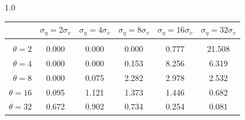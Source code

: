 \documentclass[12pt]{article}
\begin{document}
\begin{table}[h!]
\begin{subtable}{1.0\textwidth}
    \centering
\begin{tabular}{rccccc}
\hline  
            & \multicolumn{1}{l}{$\sigma_{\eta} =2\sigma_{v}$} & \multicolumn{1}{l}{$\sigma_{\eta} =4\sigma_{v}$} & \multicolumn{1}{l}{$\sigma_{\eta} =8\sigma_{v}$} & \multicolumn{1}{l}{$\sigma_{\eta} =16\sigma_{v}$} & \multicolumn{1}{l}{$\sigma_{\eta} =32\sigma_{v}$} \\ \hline  \vspace{-3mm} \\        
$\theta=2$  & 0.000                                             & 0.000                                             & 0.000                                             & 0.777                                              & 21.508                                             \\ \hline
$\theta=4$  & 0.000                                             & 0.000                                             & 0.153                                             & 8.256                                              & 6.319                                              \\ \hline
$\theta=8$  & 0.000                                             & 0.075                                             & 2.282                                             & 2.978                                              & 2.532                                              \\ \hline
$\theta=16$ & 0.095                                             & 1.121                                             & 1.373                                             & 1.446                                              & 0.682                                              \\ \hline
$\theta=32$ & 0.672                                             & 0.902                                             & 0.734                                             & 0.254                                              & 0.081                                              \\ \hline
\end{tabular}
\end{subtable}


\end{table}
\end{document}
